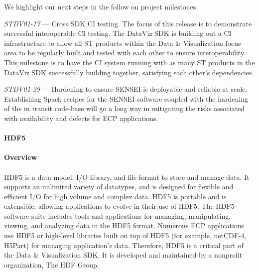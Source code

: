 We highlight our next steps in the follow on project milestones.

\textit{STDV01-17} --- Cross SDK CI testing. The focus of this release is to demonstrate successful interoperable CI testing. The DataViz SDK is building out a CI infrastructure to allow all ST products within the Data \& Visualization focus area to be regularly built and tested with each other to ensure interoperability. This milestone is to have the CI system running with as many ST products in the DataViz SDK successfully building together, satisfying each other's dependencies.

\textit{STDV01-29} --- Hardening to ensure SENSEI is deployable and reliable at scale. Establishing Spack recipes for the SENSEI software coupled with the hardening of the in transit code-base will go a long way in mitigating the risks associated with availability and defects for ECP applications. 

\paragraph{HDF5}
\paragraph{Overview}
\paragraph{}
HDF5 is a data model, I/O library, and file format to store and manage data. It supports an unlimited variety of datatypes, and is designed for flexible and efficient I/O for high volume and complex data. HDF5 is portable and is extensible, allowing applications to evolve in their use of HDF5. The HDF5 software suite includes tools and applications for managing, manipulating, viewing, and analyzing data in the HDF5 format. Numerous ECP applications use HDF5 or high-level libraries built on top of HDF5 (for example, netCDF-4, H5Part) for managing application's data. Therefore, HDF5 is a critical part of the Data \& Visualization SDK. It is developed and maintained by a nonprofit organization, The HDF Group.


